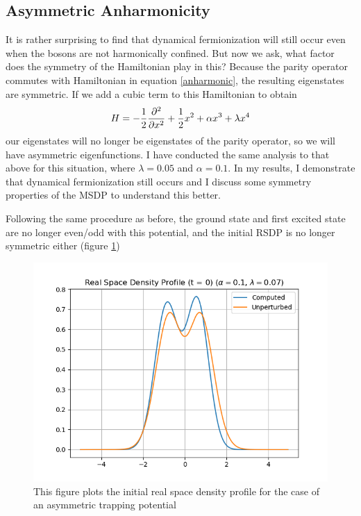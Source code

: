 \documentclass[onecolumn,english,aps,pra]{revtex4}
\begin{document}
\subsection*{Asymmetric Anharmonicity}
It is rather surprising to find that dynamical fermionization will still occur even when the bosons are not harmonically confined. But now we ask, what factor does the symmetry of the Hamiltonian play in this? Because the parity operator commutes with Hamiltonian in equation \ref{anharmonic}, the resulting eigenstates are symmetric. If we add a cubic term to this Hamiltonian to obtain
\begin{equation}
H =  -\frac{1}{2} \pdv[2]{}{x} + \frac{1}{2} x^2 + \alpha x^3 + \lambda x^4 
\label{AnharmonicCubic}
\end{equation}
our eigenstates will no longer be eigenstates of the parity operator, so we will have asymmetric eigenfunctions. I have conducted the same analysis to that above for this situation, where $\lambda = 0.05$ and $\alpha = 0.1$. In my results, I demonstrate that dynamical fermionization still occurs and I discuss some symmetry properties of the MSDP to understand this better.

Following the same procedure as before, the ground state and first excited state are no longer even/odd with this potential, and the initial RSDP is no longer symmetric either (figure \ref{fig:RSDP_ASYM})

\begin{figure}[H]
\center
\includegraphics[scale=0.8]{../Plots/Anharmonic/InitRSDP-ASYM}
\caption{This figure plots the initial real space density profile for the case of an asymmetric trapping potential}
\label{fig:RSDP_ASYM}
\end{figure}
\end{document}
